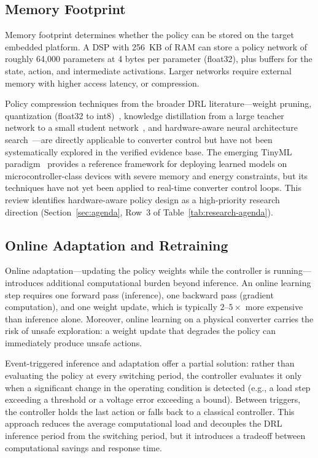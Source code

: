 \documentclass[manuscript,screen,review]{acmart}
\begin{document}
\subsection{Memory Footprint}

Memory footprint determines whether the policy can be stored on the target embedded platform.
A DSP with 256~KB of RAM can store a policy network of roughly 64,000 parameters at 4 bytes per parameter (float32), plus buffers for the state, action, and intermediate activations.
Larger networks require external memory with higher access latency, or compression.

Policy compression techniques from the broader DRL literature---weight pruning, quantization (float32 to int8)~\cite{gholami2021survey}, knowledge distillation from a large teacher network to a small student network~\cite{hinton2015distilling}, and hardware-aware neural architecture search~\cite{cheng2018survey}---are directly applicable to converter control but have not been systematically explored in the verified evidence base.
The emerging TinyML paradigm~\cite{sanchez2020tinyml} provides a reference framework for deploying learned models on microcontroller-class devices with severe memory and energy constraints, but its techniques have not yet been applied to real-time converter control loops.
This review identifies hardware-aware policy design as a high-priority research direction (Section~\ref{sec:agenda}, Row~3 of Table~\ref{tab:research-agenda}).

\subsection{Online Adaptation and Retraining}

Online adaptation---updating the policy weights while the controller is running---introduces additional computational burden beyond inference.
An online learning step requires one forward pass (inference), one backward pass (gradient computation), and one weight update, which is typically $2$--$5\times$ more expensive than inference alone.
Moreover, online learning on a physical converter carries the risk of unsafe exploration: a weight update that degrades the policy can immediately produce unsafe actions.

Event-triggered inference and adaptation offer a partial solution: rather than evaluating the policy at every switching period, the controller evaluates it only when a significant change in the operating condition is detected (e.g., a load step exceeding a threshold or a voltage error exceeding a bound).
Between triggers, the controller holds the last action or falls back to a classical controller.
This approach reduces the average computational load and decouples the DRL inference period from the switching period, but it introduces a tradeoff between computational savings and response time.
\end{document}
